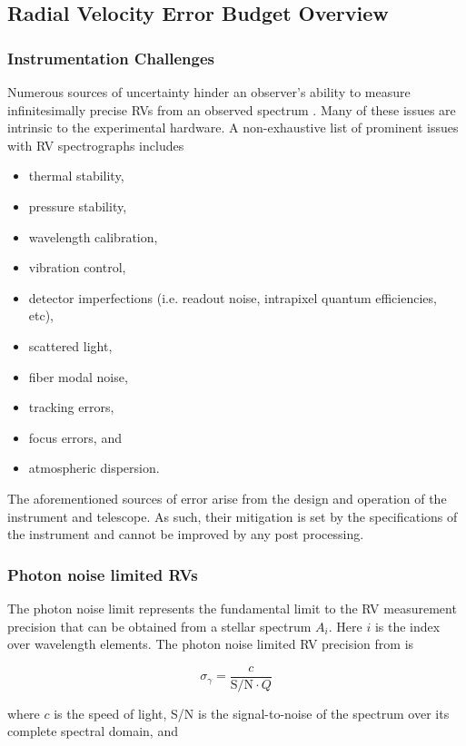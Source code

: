 \subsection{Radial Velocity Error Budget Overview}
\subsubsection{Instrumentation Challenges}
Numerous sources of uncertainty hinder an observer's ability to measure infinitesimally precise
RVs from an observed spectrum \citep{podgorski14,halverson16}.
Many of these issues are intrinsic to the experimental
hardware. A non-exhaustive list of prominent issues with RV spectrographs includes

\begin{itemize}
\item thermal stability,
\item pressure stability,
\item wavelength calibration,
\item vibration control,
\item detector imperfections (i.e. readout noise, intrapixel quantum efficiencies, etc),
\item scattered light,
\item fiber modal noise,
\item tracking errors,
\item focus errors, and
\item atmospheric dispersion.
\end{itemize}

\noindent The aforementioned sources of error arise from the design and operation of the
instrument and telescope. As such, their mitigation is set by the specifications of the instrument
and cannot be improved by any post processing. 

\subsubsection{Photon noise limited RVs}
The photon noise limit represents the fundamental limit to the RV measurement precision that can
be obtained from a stellar spectrum $A_i$. Here $i$ is the index over wavelength elements.
The photon noise limited RV precision from \cite{bouchy01} is

\begin{equation}
  \sigma_{\gamma} = \frac{c}{\text{S/N} \cdot Q}
\end{equation}

\noindent where $c$ is the speed of light, S/N is the signal-to-noise of the spectrum over its
complete spectral domain, and

